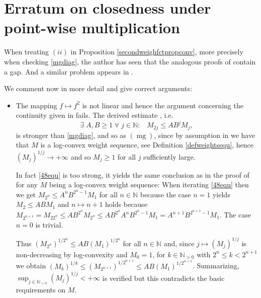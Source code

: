 \documentclass[10pt]{amsart}%
\numberwithin{equation}{section}
\theoremstyle{plain}
\newcommand{\NN}{\mathbb{N}}
\let\on=\operatorname
\begin{document}
\appendix

\section{Erratum on closedness under point-wise multiplication}\label{erratum}
When treating $(ii)$ in Proposition \ref{secondweighfctpropconv}, more precisely when checking \eqref{mgdiag}, the author has seen that the analogous proofs of \cite[Prop. 4.7 \& 4.12]{weightedentirecharacterization} contain a gap. And a similar problem appears in \cite[Prop. 4.7]{Borelmapalgebraity}.\vspace{6pt}

We comment now in more detail and give correct arguments:

\begin{itemize}
\item[$(I)$] The mapping $f\mapsto f^2$ is not linear and hence the argument concerning the continuity given in \cite[Prop. 4.7]{weightedentirecharacterization} fails. The derived estimate \cite[$(4.8)$]{weightedentirecharacterization}, i.e.
    \begin{equation}\label{48equ}
    \exists\;A,B\ge 1\;\forall\;j\in\NN:\;\;\;M_{2j}\le AB^jM_j,
    \end{equation}
     is stronger than \eqref{mgdiag}, and so as \hyperlink{mg}{$(\on{mg})$}, since by assumption in \cite[Prop. 4.7]{weightedentirecharacterization} we have that $M$ is a log-convex weight sequence, see Definition \ref{defweightsequ}, hence $(M_j)^{1/j}\rightarrow+\infty$ and so $M_j\ge 1$ for all $j$ sufficiently large.

     In fact \eqref{48equ} is too strong, it yields the same conclusion as \cite[$(4.9)$]{weightedentirecharacterization} in the proof of \cite[Cor. 4.14]{weightedentirecharacterization} for any $M$ being a log-convex weight sequence: When iterating \eqref{48equ} then we get $M_{2^n}\le A^nB^{2^n-1}M_1$ for all $n\in\NN$ because the case $n=1$ yields $M_2\le ABM_1$ and $n\mapsto n+1$ holds because $M_{2^{n+1}}=M_{22^n}\le AB^{2^n}M_{2^n}\le AB^{2^n}A^nB^{2^n-1}M_1=A^{n+1}B^{2^{n+1}-1}M_1$. The case $n=0$ is trivial.

Thus $(M_{2^n})^{1/2^n}\le AB(M_1)^{1/2^n}$ for all $n\in\NN$ and, since $j\mapsto(M_j)^{1/j}$ is non-decreasing by log-convexity and $M_0=1$, for $k\in\NN_{>0}$ with $2^n\le k<2^{n+1}$ we obtain $(M_k)^{1/k}\le(M_{2^{n+1}})^{1/2^{n+1}}\le AB(M_1)^{1/2^{n+1}}$. Summarizing, $\sup_{j\in\NN_{>0}}(M_j)^{1/j}<+\infty$ is verified but this contradicts the basic requirements on $M$.


\end{itemize}
\end{document}
